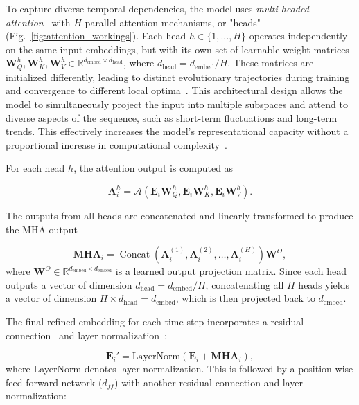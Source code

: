 To capture diverse temporal dependencies, the model uses \textit{multi-headed attention}~\cite{michel2019sixteen} with $H$ parallel attention mechanisms, or "heads" (Fig.~\ref{fig:attention_workings}). Each head $h \in \{1, ..., H\}$ operates independently on the same input embeddings, but with its own set of learnable weight matrices $\mathbf{W}_Q^h, \mathbf{W}_K^h, \mathbf{W}_V^h \in \mathbb{R}^{d_{\text{embed}} \times d_{\text{head}}}$, where $d_{\text{head}} = d_{\text{embed}} / H$. These matrices are initialized differently, leading to distinct evolutionary trajectories during training and convergence to different local optima~\cite{zhang2019improving}. This architectural design allows the model to simultaneously project the input into multiple subspaces and attend to diverse aspects of the sequence, such as short-term fluctuations and long-term trends. This effectively increases the model's representational capacity without a proportional increase in computational complexity~\cite{vaswani2017attention}.

For each head $h$, the attention output is computed as

\begin{equation}
    \mathbf{A}_i^h = \mathcal{A}(\mathbf{E}_i\mathbf{W}_Q^h, \mathbf{E}_i\mathbf{W}_K^h, \mathbf{E}_i\mathbf{W}_V^h).
\end{equation}

The outputs from all heads are concatenated and linearly transformed to produce the \ac{MHA} output

\begin{equation}
    \mathbf{MHA}_i = \operatorname{Concat}(\mathbf{A}_i^{(1)}, \mathbf{A}_i^{(2)}, \ldots, \mathbf{A}_i^{(H)}) \mathbf{W}^O,
\end{equation}
where $\mathbf{W}^O \in \mathbb{R}^{d_{\text{embed}} \times d_{\text{embed}}}$ is a learned output projection matrix. Since each head outputs a vector of dimension $d_{\text{head}} = d_{\text{embed}}/H$, concatenating all $H$ heads yields a vector of dimension $H \times d_{\text{head}} = d_{\text{embed}}$, which is then projected back to $d_{\text{embed}}$.

The final refined embedding for each time step incorporates a residual connection~\cite{he2016deep} and layer normalization~\cite{lei2016layer}:

\begin{equation}
    \mathbf{E}_i' = \text{LayerNorm}(\mathbf{E}_i + \mathbf{MHA}_i),
\end{equation}
where \ac{LayerNorm} denotes layer normalization. This is followed by a position-wise feed-forward network ($d_{ff}$) with another residual connection and layer normalization:

